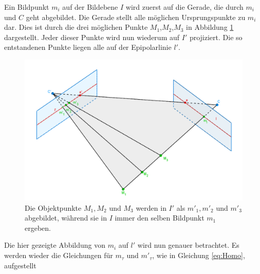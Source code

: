 Ein Bildpunkt $m_i$ auf der Bildebene $I$ wird zuerst auf die Gerade, die durch $m_i$ und $C$ geht abgebildet. Die Gerade stellt alle möglichen Ursprungspunkte zu $m_i$ dar. Dies ist durch die drei möglichen Punkte $M_1$,$M_2$,$M_3$ in Abbildung \ref{fig:Epipolarconstraint} dargestellt. Jeder dieser Punkte wird nun wiederum auf $I'$ projiziert. Die so entstandenen Punkte liegen alle auf der Epipolarlinie $l'$\cite{HZ}. 


\begin{figure}[!htb]
	\centering
	\includegraphics[width=.8\linewidth]{images/EpipolarLinien.png}
	\caption[Punkte und Epipolarlinien]{Die Objektpunkte $M_1, M_2$ und $M_3$ werden in $I'$ als $m'_1, m'_2$ und $m'_3$ abgebildet, während sie in $I$ immer den selben Bildpunkt $m_1$ ergeben.}  
	\label{fig:Epipolarconstraint}
\end{figure}


Die hier gezeigte Abbildung von $m_i$ auf $l'$ wird nun genauer betrachtet. Es werden wieder die Gleichungen für $m_\tau$ und $m'_\tau$, wie in Gleichung \ref{eq:Homo}, aufgestellt    

